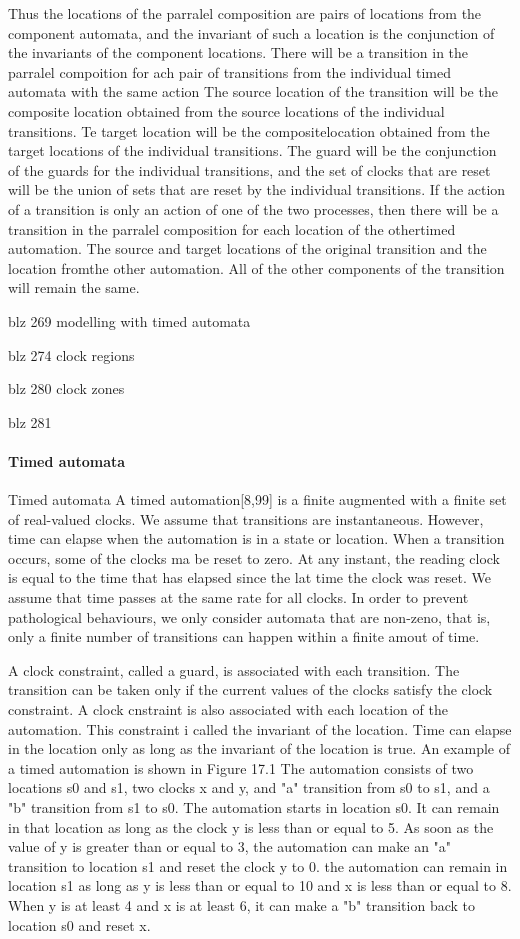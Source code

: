 Thus the locations of the parralel composition are pairs of locations from the component automata, and the invariant of such a location is the conjunction of the invariants of the component locations. There will be a transition in the parralel compoition for ach pair of transitions from the individual timed automata with the same action The source location of the transition will be the composite location obtained from the source locations of the individual transitions. Te target location will be the compositelocation obtained from the target locations of the individual transitions. The guard will be the conjunction of the guards for the individual transitions, and the set of clocks that are reset will be the union of sets that are reset by the individual transitions. If the action of  a transition is only an action of one of the two processes, then there will be a transition in the parralel composition for each location of the othertimed automation. The source and target locations of the original transition and the location fromthe other automation. All of the other components of the transition will remain the same.

		
blz 269 modelling with timed automata

blz 274 clock regions

blz 280 clock zones

blz 281
\paragraph{Timed automata}
Timed automata
A timed automation[8,99] is a finite augmented with a finite set of  real-valued clocks. We assume that transitions are instantaneous. However, time can elapse when the automation is in a state or location. When a transition occurs, some of the clocks ma be reset to zero. At any instant, the reading clock is equal to the time that has elapsed since the lat time the clock was reset. We assume that time passes at the same rate for all clocks. In order to prevent pathological behaviours, we only consider automata that are non-zeno, that is, only a finite number of transitions can happen within a finite amout of time.

A clock constraint, called a guard, is associated with each transition. The transition can be taken only if the current values of the clocks satisfy the clock constraint. A clock cnstraint is also associated with each location of the automation. This constraint i called the invariant of the location. Time can elapse in the location only as long as the invariant of the location is true. An example of a timed automation is shown in Figure 17.1 The automation consists of two locations s0 and s1, two clocks x and y, and "a" transition from s0 to s1, and a "b" transition from s1 to s0. The automation starts in location s0. It can remain in that location as long as the clock y is less than or equal to 5. As soon as the value of y is greater than or equal to 3, the  automation can make an "a" transition to location s1 and reset the clock y to 0. the automation can remain in location s1 as long as y is less than or equal to 10 and x is less than or equal to 8. When y is at least 4 and x is at least 6, it can make a "b" transition back to location s0 and reset x.

